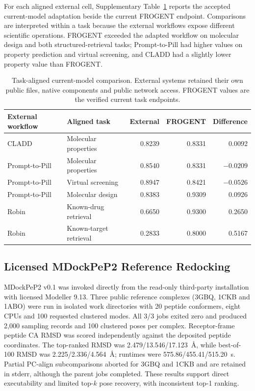 \documentclass{article}
\begin{document}
For each aligned external cell, Supplementary Table~\ref{tab:sup-external-paired} reports the accepted current-model adaptation beside the current FROGENT endpoint. Comparisons are interpreted within a task because the external workflows expose different scientific operations. FROGENT exceeded the adapted workflow on molecular design and both structured-retrieval tasks; Prompt-to-Pill had higher values on property prediction and virtual screening, and CLADD had a slightly lower property value than FROGENT.

\begin{table}[htbp]
\centering
\small
\caption{Task-aligned current-model comparison. External systems retained their own public files, native components and public network access. FROGENT values are the verified current task endpoints.}
\label{tab:sup-external-paired}
\begin{tabular}{llrrr}
\toprule
External workflow & Aligned task & External & FROGENT & Difference \\
\midrule
CLADD & Molecular properties & 0.8239 & 0.8331 & 0.0092 \\
Prompt-to-Pill & Molecular properties & 0.8540 & 0.8331 & $-0.0209$ \\
Prompt-to-Pill & Virtual screening & 0.8947 & 0.8421 & $-0.0526$ \\
Prompt-to-Pill & Molecular design & 0.8383 & 0.9309 & 0.0926 \\
Robin & Known-drug retrieval & 0.6650 & 0.9300 & 0.2650 \\
Robin & Known-target retrieval & 0.2833 & 0.8000 & 0.5167 \\
\bottomrule
\end{tabular}
\end{table}

\subsection{Licensed MDockPeP2 Reference Redocking}

MDockPeP2 v0.1 was invoked directly from the read-only third-party installation with licensed Modeller 9.13. Three public reference complexes (3GBQ, 1CKB and 1ABO) were run in isolated work directories with 20 peptide conformers, eight CPUs and 100 requested clustered modes. All 3/3 jobs exited zero and produced 2,000 sampling records and 100 clustered poses per complex. Receptor-frame peptide CA RMSD was scored independently against the deposited peptide coordinates. The top-ranked RMSD was 2.479/13.546/17.123~\AA, while best-of-100 RMSD was 2.225/2.336/4.564~\AA; runtimes were 575.86/455.41/515.20~s. Partial PC-align subcomparisons aborted for 3GBQ and 1CKB and are retained in stderr, although the parent jobs completed. These results support direct executability and limited top-$k$ pose recovery, with inconsistent top-1 ranking.
\end{document}
